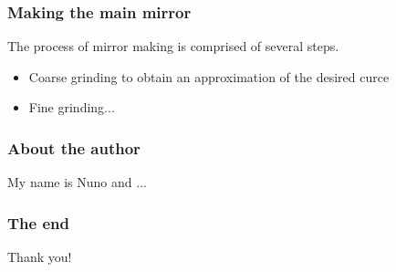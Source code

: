 \documentclass{beamer}
\begin{document}
\begin{frame}
\frametitle{Making the main mirror}
The process of mirror making is comprised of several steps.

\begin{itemize}
\item Coarse grinding to obtain an approximation of the desired curce
\item Fine grinding...
\end{itemize}
\end{frame}

\begin{frame}
\frametitle{About the author}
My name is Nuno and ...
\end{frame}

\begin{frame}
\frametitle{The end}
Thank you!
\end{frame}
\end{document}
